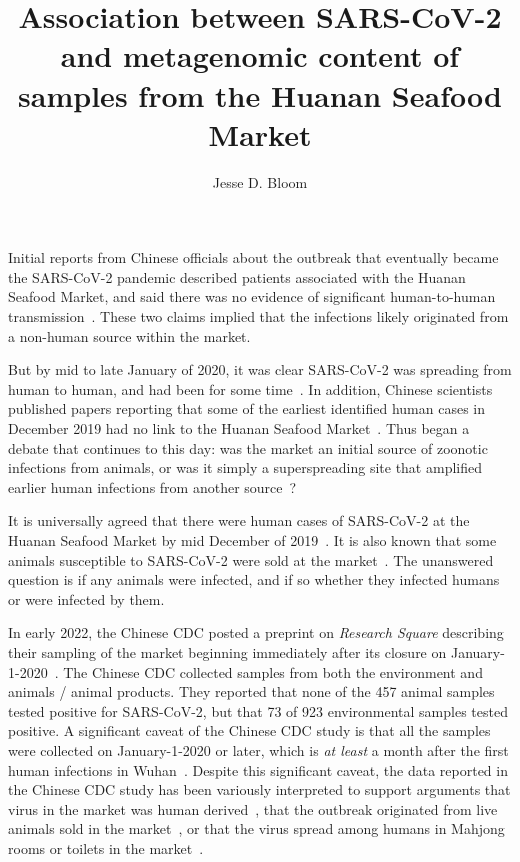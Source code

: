 \documentclass[9pt,twocolumn,twoside]{gsajnl_modified}
\title{Association between SARS-CoV-2 and metagenomic content of samples from the Huanan Seafood Market}
\author[]{\Large Jesse D. Bloom}
\affil[]{Fred Hutchinson Cancer Center; Howard Hughes Medical Institute

}
\begin{document}
\maketitle
\thispagestyle{firststyle}
\firstpagefootnote

\vspace{-33pt}%

\lettrine[lines=2]{\color{color2}I}{}nitial reports from Chinese officials about the outbreak that eventually became the SARS-CoV-2 pandemic described patients associated with the Huanan Seafood Market, and said there was no evidence of significant human-to-human transmission~\citep{ProMED2109, healthcommission2019, healthcommission2020, who2020}.
These two claims implied that the infections likely originated from a non-human source within the market.

But by mid to late January of 2020, it was clear SARS-CoV-2 was spreading from human to human, and had been for some time~\citep{chan2020familial,phan2020importation,li2020early,nishiura2020initial}.
In addition, Chinese scientists published papers reporting that some of the earliest identified human cases in December 2019 had no link to the Huanan Seafood Market~\citep{huang2020clinical,chen2020epidemiological}.
Thus began a debate that continues to this day: was the market an initial source of zoonotic infections from animals, or was it simply a superspreading site that amplified earlier human infections from another source~\citep{cohen2020wuhan}?

It is universally agreed that there were human cases of SARS-CoV-2 at the Huanan Seafood Market by mid December of 2019~\citep{li2020early}.
It is also known that some animals susceptible to SARS-CoV-2 were sold at the market~\citep{xiao2021animal}.
The unanswered question is if any animals were infected, and if so whether they infected humans or were infected by them.

In early 2022, the Chinese CDC posted a preprint on \textit{Research Square} describing their sampling of the market beginning immediately after its closure on January-1-2020~\citep{liu2022surveillance}.
The Chinese CDC collected samples from both the environment and animals / animal products.
They reported that none of the 457 animal samples tested positive for SARS-CoV-2, but that 73 of 923 environmental samples tested positive.
A significant caveat of the Chinese CDC study is that all the samples were collected on January-1-2020 or later, which is \emph{at least} a month after the first human infections in Wuhan~\citep{odni2022,zhang2020viral,van2020emergence,pipes2021assessing}.
Despite this significant caveat, the data reported in the Chinese CDC study has been variously interpreted to support arguments that virus in the market was human derived~\citep{liu2022surveillance}, that the outbreak originated from live animals sold in the market~\citep{worobey2022huanan}, or that the virus spread among humans in Mahjong rooms or toilets in the market~\citep{courtier2022sars}.
\end{document}

